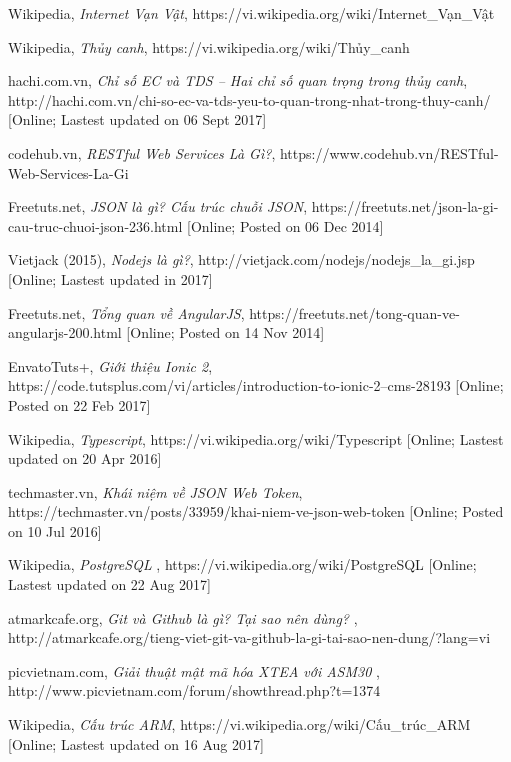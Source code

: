 \documentclass[a4paper,12pt,oneside]{article}
\begin{document}
\begin{thebibliography}{80}

 Wikipedia, 
\textit{Internet Vạn Vật}, https://vi.wikipedia.org/wiki/Internet\_Vạn\_Vật

 Wikipedia,
 \textit{Thủy canh}, https://vi.wikipedia.org/wiki/Thủy\_canh

 hachi.com.vn, 
\textit{Chỉ số EC và TDS – Hai chỉ số quan trọng trong thủy canh}, http://hachi.com.vn/chi-so-ec-va-tds-yeu-to-quan-trong-nhat-trong-thuy-canh/ [Online; Lastest updated on 06 Sept 2017] %

 codehub.vn,
 \textit{RESTful Web Services Là Gì?}, https://www.codehub.vn/RESTful-Web-Services-La-Gi

 Freetuts.net, 
\textit{JSON là gì? Cấu trúc chuỗi JSON}, https://freetuts.net/json-la-gi-cau-truc-chuoi-json-236.html [Online; Posted on 06 Dec 2014]

 Vietjack (2015), 
\textit{Nodejs là gì?}, http://vietjack.com/nodejs/nodejs\_la\_gi.jsp [Online; Lastest updated in 2017]

 Freetuts.net, 
\textit{Tổng quan về AngularJS}, https://freetuts.net/tong-quan-ve-angularjs-200.html [Online; Posted on 14 Nov 2014]

 EnvatoTuts+,
 \textit{Giới thiệu Ionic 2}, https://code.tutsplus.com/vi/articles/introduction-to-ionic-2--cms-28193 [Online; Posted on 22 Feb 2017]

 Wikipedia, 
\textit{Typescript}, https://vi.wikipedia.org/wiki/Typescript [Online; Lastest updated on 20 Apr 2016]

 techmaster.vn,
\textit{Khái niệm về JSON Web Token}, https://techmaster.vn/posts/33959/khai-niem-ve-json-web-token [Online; Posted on 10 Jul 2016]

 Wikipedia, 
\textit{PostgreSQL} , https://vi.wikipedia.org/wiki/PostgreSQL [Online; Lastest updated on 22 Aug 2017]

 atmarkcafe.org, 
\textit{Git và Github là gì? Tại sao nên dùng?} , http://atmarkcafe.org/tieng-viet-git-va-github-la-gi-tai-sao-nen-dung/?lang=vi

 picvietnam.com,
\textit{Giải thuật mật mã hóa XTEA với ASM30} , http://www.picvietnam.com/forum/showthread.php?t=1374

 Wikipedia, 
\textit{Cấu trúc ARM}, https://vi.wikipedia.org/wiki/Cấu\_trúc\_ARM [Online; Lastest updated on 16 Aug 2017] %


\end{thebibliography}
\end{document}
